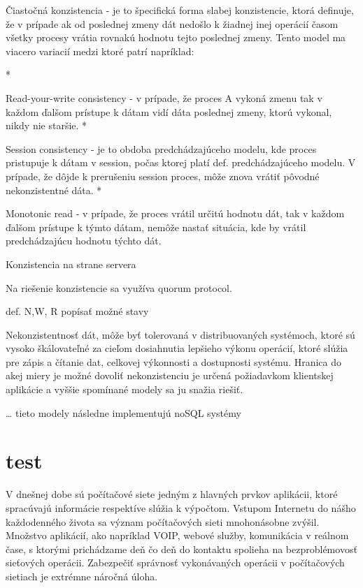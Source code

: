 \documentclass[11pt,twoside,a4paper]{book}
\begin{document}
Čiastočná konzistencia - je to špecifická forma slabej konzistencie, ktorá definuje, že v prípade ak od poslednej zmeny dát nedošlo k žiadnej inej operácií časom všetky procesy vrátia rovnakú hodnotu tejto poslednej zmeny. Tento model ma viacero variacií medzi ktoré patrí napríklad:

    *

      Read-your-write consistency - v prípade, že proces A vykoná zmenu tak v každom ďalšom prístupe k dátam vidí dáta poslednej zmeny, ktorú vykonal, nikdy nie staršie.
    *

      Session consistency - je to obdoba predchádzajúceho modelu, kde proces pristupuje k dátam v session, počas ktorej platí def. predchádzajúceho modelu. V prípade, že dôjde k prerušeniu session proces, môže znova vrátiť pôvodné nekonzistentné dáta.
    *

      Monotonic read - v prípade, že proces vrátil  určitú hodnotu dát, tak v každom ďalšom prístupe k týmto dátam, nemôže nastať situácia, kde by vrátil predchádzajúcu hodnotu týchto dát.


Konzistencia na strane servera

Na riešenie konzistencie sa využíva quorum protocol.

def. N,W, R popísať možné stavy

Nekonzistentnosť dát, môže byť tolerovaná v distribuovaných systémoch, ktoré sú vysoko škálovateľné za cieľom dosiahnutia lepšieho výkonu operácií, ktoré slúžia pre zápis a čítanie dat, celkovej výkonnosti a dostupnosti systému. Hranica do akej miery je možné dovoliť nekonzistenciu je určená požiadavkom klientskej aplikácie a vyššie spomínané modely sa ju snažia riešiť.

… tieto modely následne implementujú noSQL systémy

















\chapter{test}

V dnešnej dobe sú počítačové siete jedným z hlavných prvkov aplikácii, ktoré spracúvajú informácie respektíve slúžia k výpočtom. Vstupom Internetu do nášho každodenného života sa význam počítačových sieti mnohonásobne zvýšil. Množstvo aplikácií, ako napríklad VOIP, webové služby, komunikácia v reálnom čase, s ktorými prichádzame deň čo deň do kontaktu spolieha na bezproblémovosť sieťových operácii. Zabezpečiť správnosť vykonávaných operácii v počítačových sietiach je extrémne náročná úloha.
\end{document}
